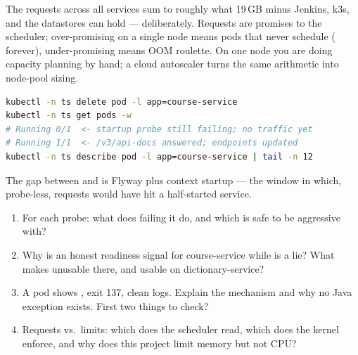 \begin{hardware}
The requests across all services sum to roughly what 19\,GB minus
Jenkins, k3s, and the datastores can hold --- deliberately. Requests are
promises to the scheduler; over-promising on a single node means pods
that never schedule ( forever), under-promising means
OOM roulette. On one node you are doing capacity planning by hand;
a cloud autoscaler turns the same arithmetic into node-pool sizing.
\end{hardware}

\begin{handson}
\begin{lstlisting}[language=bash]
kubectl -n ts delete pod -l app=course-service
kubectl -n ts get pods -w
# Running 0/1  <- startup probe still failing; no traffic yet
# Running 1/1  <- /v3/api-docs answered; endpoints updated
kubectl -n ts describe pod -l app=course-service | tail -n 12
\end{lstlisting}
The gap between  and  is Flyway plus context
startup --- the window in which, probe-less, requests would have hit a
half-started service.
\end{handson}

\begin{quiz}
\begin{enumerate}
  \item For each probe: what does failing it do, and which is safe to
  be aggressive with?
  \item Why is  an honest readiness signal for
  course-service while  is a lie? What makes
   unusable there, and usable on
  dictionary-service?
  \item A pod shows , exit 137, clean logs. Explain the
  mechanism and why no Java exception exists. First two things to check?
  \item Requests vs.\ limits: which does the scheduler read, which does
  the kernel enforce, and why does this project limit memory but not
  CPU?
\end{enumerate}
\end{quiz}
